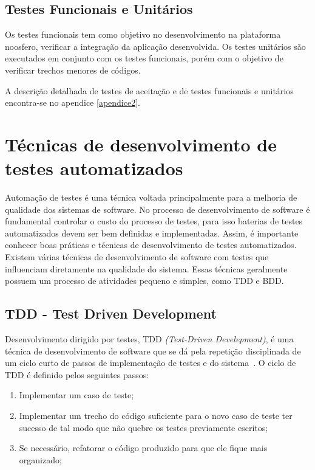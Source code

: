 \subsection{Testes Funcionais e Unitários}
%
Os testes funcionais tem como objetivo no desenvolvimento na plataforma noosfero, verificar a integração da aplicação desenvolvida. Os testes unitários são executados em conjunto com os testes funcionais, porém  com o objetivo de verificar trechos menores de códigos. 

A descrição detalhada de testes de aceitação e de testes funcionais e unitários encontra-se no apendice \ref{apendice2}.

\section{Técnicas de desenvolvimento de testes automatizados}

Automação de testes é uma técnica voltada principalmente para a melhoria de 
qualidade dos sistemas de software. 
%
No processo de desenvolvimento de software é fundamental controlar o custo do 
processo de testes, para isso baterias de testes automatizados devem ser bem 
definidas e implementadas. Assim, é importante conhecer boas práticas e técnicas 
de desenvolvimento de testes automatizados.    
%
Existem várias técnicas de desenvolvimento de software com testes que influenciam 
diretamente na qualidade do sistema. Essas técnicas geralmente possuem um processo 
de atividades pequeno e simples, como TDD e BDD.

\subsection{TDD - Test Driven Development}

Desenvolvimento dirigido por testes, TDD \textit{(Test-Driven Develepment)}, 
é uma técnica de desenvolvimento de software que se dá pela repetição disciplinada 
de um ciclo curto de passos de implementação de testes e do sistema~\cite{koskela2007}.
%
O ciclo de TDD é definido pelos seguintes passos:
%
\begin{enumerate}
\item Implementar um caso de teste;
\item Implementar um trecho do código suficiente para o novo caso de teste ter sucesso 
de tal modo que não quebre os testes previamente escritos;
\item Se necessário, refatorar o código produzido para que ele fique mais organizado;
\end{enumerate}

